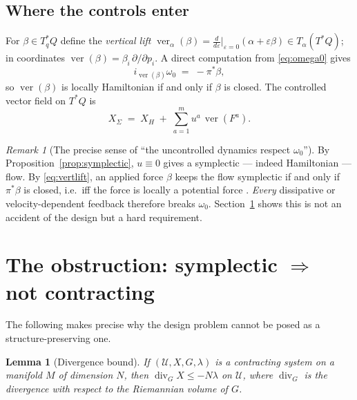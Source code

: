 \documentclass[11pt,a4paper]{article}
\newcommand{\dive}{\operatorname{div}}
\newcommand{\ver}{\operatorname{ver}}
\newcommand{\Tstar}{T^{*}Q}
\theoremstyle{plain}
\newtheorem{lemma}[theorem]{Lemma}
\theoremstyle{definition}
\theoremstyle{remark}
\newtheorem{remark}[theorem]{Remark}
\begin{document}
\subsection{Where the controls enter}

For $\beta \in T^{*}_qQ$ define the \emph{vertical lift}
$\ver_\alpha(\beta) = \frac{d}{d\varepsilon}\big|_{\varepsilon=0}(\alpha + \varepsilon\beta)
\in T_\alpha(\Tstar)$; in coordinates $\ver(\beta) = \beta_i\,\partial/\partial p_i$.
A direct computation from \eqref{eq:omega0} gives
\begin{equation}
  i_{\ver(\beta)}\omega_0 \;=\; -\pi^{*}\beta ,
  \label{eq:vertlift}
\end{equation}
so $\ver(\beta)$ is locally Hamiltonian if and only if $\beta$ is closed. The
controlled vector field on $\Tstar$ is
\begin{equation}
  X_\Sigma \;=\; X_H \;+\; \sum_{a=1}^{m} u^a\,\ver\!\left(F^a\right).
  \label{eq:Xsigma}
\end{equation}

\begin{remark}[The precise sense of ``the uncontrolled dynamics respect $\omega_0$'']
\label{rem:sense}
By Proposition~\ref{prop:symplectic}, $u \equiv 0$ gives a symplectic --- indeed
Hamiltonian --- flow. By \eqref{eq:vertlift}, an applied force $\beta$ keeps the
flow symplectic if and only if $\pi^{*}\beta$ is closed, i.e.\ iff the force is
locally a potential force \cite[\S4.4.4]{BL04}. \emph{Every} dissipative or
velocity-dependent feedback therefore breaks $\omega_0$. Section~\ref{sec:obstruction}
shows this is not an accident of the design but a hard requirement.
\end{remark}

\section{The obstruction: symplectic \texorpdfstring{$\Rightarrow$}{=>} not contracting}
\label{sec:obstruction}

The following makes precise why the design problem cannot be posed as a
structure-preserving one.

\begin{lemma}[Divergence bound]
\label{lem:div}
If $(\mathcal{U},X,G,\lambda)$ is a contracting system on a manifold $M$ of
dimension $N$, then $\dive_G X \le -N\lambda$ on $\mathcal{U}$, where $\dive_G$ is
the divergence with respect to the Riemannian volume of $G$.
\end{lemma}
\end{document}

